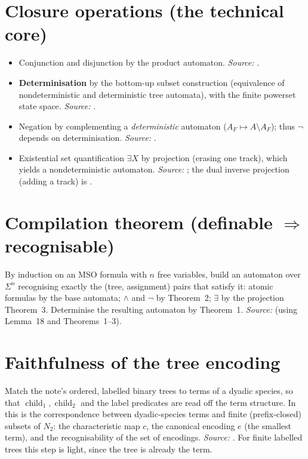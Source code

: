 \documentclass[11pt]{article}
\newcommand{\MSO}{\ensuremath{\mathrm{MSO}}}
\begin{document}
\section{Closure operations (the technical core)}
\begin{itemize}[leftmargin=*]
  \item Conjunction and disjunction by the product automaton.
    \hfill\emph{Source:} \cite[Theorem~2(ii), p.~62]{TW}.
  \item \textbf{Determinisation} by the bottom-up subset construction (equivalence
    of nondeterministic and deterministic tree automata), with the finite
    powerset state space.
    \hfill\emph{Source:} \cite[Theorem~1, pp.~61--62]{TW}.
  \item Negation by complementing a \emph{deterministic} automaton
    (\(A_F\mapsto A\setminus A_F\)); thus \(\neg\) depends on determinisation.
    \hfill\emph{Source:} \cite[Theorem~2(i), p.~62]{TW}.
  \item Existential set quantification \(\exists X\) by projection (erasing one
    track), which yields a nondeterministic automaton.
    \hfill\emph{Source:} \cite[Theorem~3, pp.~62--63]{TW}; the dual inverse
    projection (adding a track) is \cite[Theorem~4, pp.~63--64]{TW}.
\end{itemize}

\section{Compilation theorem (definable \(\Rightarrow\) recognisable)}
By induction on an \MSO{} formula with \(n\) free variables, build an automaton
over \(\Sigma^{n}\) recognising exactly the (tree, assignment) pairs that satisfy
it: atomic formulas by the base automata; \(\wedge\) and \(\neg\) by Theorem~2;
\(\exists\) by the projection Theorem~3.  Determinise the resulting automaton by
Theorem~1.
\hfill\emph{Source:} \cite[Theorem~17, p.~78]{TW} (using Lemma~18 and
Theorems~1--3).

\section{Faithfulness of the tree encoding}
Match the note's ordered, labelled binary trees to terms of a dyadic species, so
that \(\operatorname{child}_1,\operatorname{child}_2\) and the label predicates
are read off the term structure.  In \cite{TW} this is the correspondence between
dyadic-species terms and finite (prefix-closed) subsets of \(N_2\): the
characteristic map \(c\), the canonical encoding \(e\) (the smallest term), and
the recognisability of the set of encodings.
\hfill\emph{Source:} \cite[\S\,4, pp.~75--78; Lemmas~15--16]{TW}.  For finite
labelled trees this step is light, since the tree is already the term.
\end{document}
